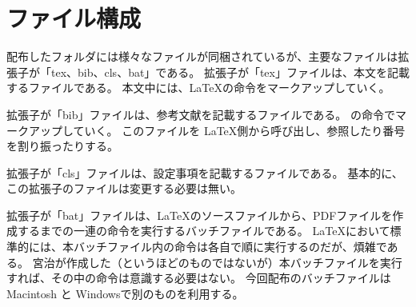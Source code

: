 \section{ファイル構成}
配布したフォルダには様々なファイルが同梱されているが、主要なファイルは拡張子が「tex、bib、cls、bat」である。
拡張子が「tex」ファイルは、本文を記載するファイルである。
本文中には、\LaTeX の命令をマークアップしていく。

拡張子が「bib」ファイルは、参考文献を記載するファイルである。
\BibTeX の命令でマークアップしていく。
このファイルを \LaTeX 側から呼び出し、参照したり番号を割り振ったりする。

拡張子が「cls」ファイルは、設定事項を記載するファイルである。
基本的に、この拡張子のファイルは変更する必要は無い。

拡張子が「bat」ファイルは、\LaTeX のソースファイルから、PDFファイルを作成するまでの一連の命令を実行するバッチファイルである。
\LaTeX において標準的には、本バッチファイル内の命令は各自で順に実行するのだが、煩雑である。
宮治が作成した（というほどのものではないが）本バッチファイルを実行すれば、その中の命令は意識する必要はない。
今回配布のバッチファイルは Macintosh と Windowsで別のものを利用する。

